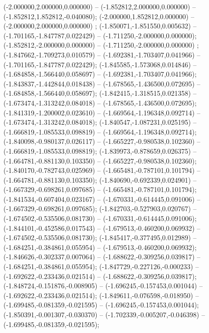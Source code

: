  (-2.000000,2.000000,0.000000) -- (-1.852812,2.000000,0.000000) -- (-1.852812,1.852812,-0.040080);
 (-2.000000,1.852812,0.000000) -- (-2.000000,2.000000,0.000000) ;
 (-1.850071,-1.851550,0.005632) -- (-1.701165,-1.847787,0.022429) -- (-1.711250,-2.000000,0.000000);
 (-1.852812,-2.000000,0.000000) -- (-1.711250,-2.000000,0.000000) ;
 (-1.847662,-1.709273,0.010579) -- (-1.692381,-1.703407,0.041966) -- (-1.701165,-1.847787,0.022429);
 (-1.845585,-1.573068,0.014846) -- (-1.684858,-1.566440,0.058697) -- (-1.692381,-1.703407,0.041966);
 (-1.843837,-1.442844,0.018438) -- (-1.678565,-1.436500,0.072695) -- (-1.684858,-1.566440,0.058697);
 (-1.842415,-1.318515,0.021358) -- (-1.673474,-1.313242,0.084018) -- (-1.678565,-1.436500,0.072695);
 (-1.841319,-1.200002,0.023610) -- (-1.669564,-1.196348,0.092714) -- (-1.673474,-1.313242,0.084018);
 (-1.840547,-1.087231,0.025195) -- (-1.666819,-1.085533,0.098819) -- (-1.669564,-1.196348,0.092714);
 (-1.840098,-0.980137,0.026117) -- (-1.665227,-0.980538,0.102360) -- (-1.666819,-1.085533,0.098819);
 (-1.839973,-0.878659,0.026375) -- (-1.664781,-0.881130,0.103350) -- (-1.665227,-0.980538,0.102360);
 (-1.840170,-0.782743,0.025969) -- (-1.665481,-0.787101,0.101794) -- (-1.664781,-0.881130,0.103350);
 (-1.840690,-0.692339,0.024901) -- (-1.667329,-0.698261,0.097685) -- (-1.665481,-0.787101,0.101794);
 (-1.841534,-0.607404,0.023167) -- (-1.670331,-0.614445,0.091006) -- (-1.667329,-0.698261,0.097685);
 (-1.842703,-0.527903,0.020767) -- (-1.674502,-0.535506,0.081730) -- (-1.670331,-0.614445,0.091006);
 (-1.844101,-0.452586,0.017543) -- (-1.679513,-0.460200,0.069932) -- (-1.674502,-0.535506,0.081730);
 (-1.845417,-0.377495,0.012989) -- (-1.684251,-0.384861,0.055954) -- (-1.679513,-0.460200,0.069932);
 (-1.846626,-0.302337,0.007064) -- (-1.688622,-0.309256,0.039817) -- (-1.684251,-0.384861,0.055954);
 (-1.847729,-0.227126,-0.000233) -- (-1.692622,-0.233436,0.021514) -- (-1.688622,-0.309256,0.039817);
 (-1.848724,-0.151876,-0.008905) -- (-1.696245,-0.157453,0.001044) -- (-1.692622,-0.233436,0.021514);
 (-1.849611,-0.076598,-0.018950) -- (-1.699485,-0.081359,-0.021595) -- (-1.696245,-0.157453,0.001044);
 (-1.850391,-0.001307,-0.030370) -- (-1.702339,-0.005207,-0.046398) -- (-1.699485,-0.081359,-0.021595);
